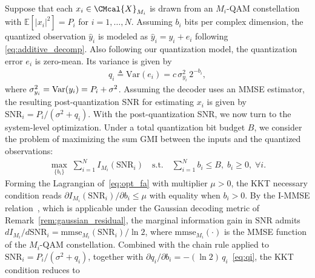 \documentclass[10pt, twocolumn, comsoc]{IEEEtran}
\begin{document}
Suppose that each $x_i \in \CMcal{X}_{M_i}$ is drawn from an $M_i$-QAM constellation with $\mathbb{E}[|x_i|^2] = P_i$ for $i = 1, \ldots, N$.
Assuming $b_i$ bits per complex dimension, the quantized observation $\hat{y}_i$ is modeled as $\hat{y}_i = y_i + e_i$ following \eqref{eq:additive_decomp}. 
Also following our quantization model, the quantization error $e_i$ is zero-mean. Its variance is given by
\begin{align} \label{eq:qi}
  q_i \triangleq \mathrm{Var}(e_i) 
  = c \, \sigma_{y_i}^2 \, 2^{-b_i},
\end{align}
where $\sigma_{y_i}^2 = {\rm{Var}}(y_i) = P_i + \sigma^2$. 
Assuming the decoder uses an MMSE estimator, the resulting post-quantization SNR for estimating $x_i$ is given by $\mathrm{SNR}_i = {P_i}/({\sigma^2 + q_i})$. With the post-quantization SNR, we now turn to the system-level optimization. 
Under a total quantization bit budget $B$, we consider the problem of maximizing the sum GMI between the inputs and the quantized observations:
\begin{align} \label{eq:opt_fa}
  \max_{\{b_i\}} \; \sum_{i=1}^N I_{M_i}(\mathrm{SNR}_i) 
  \quad 
  \text{s.t.} \quad \sum_{i=1}^N b_i \leq B, \; b_i \ge 0, \; \forall i.
\end{align} 
Forming the Lagrangian of~\eqref{eq:opt_fa} with multiplier $\mu > 0$, the KKT necessary condition reads $\partial I_{M_i}(\mathrm{SNR}_i)/\partial b_i \le \mu$ with equality when $b_i > 0$.
By the I-MMSE relation~\cite{GuoShamaiVerdu}, which is applicable under the Gaussian decoding metric of Remark~\ref{rem:gaussian_residual}, the marginal information gain in $\mathrm{SNR}$ admits $dI_{M_i}/d\mathrm{SNR}_i = \mathrm{mmse}_{M_i}(\mathrm{SNR}_i)/\ln 2$, where $\mathrm{mmse}_{M_i}(\cdot)$ is the MMSE function of the $M_i$-QAM constellation. Combined with the chain rule applied to $\mathrm{SNR}_i = P_i/(\sigma^2 + q_i)$, together with $\partial q_i / \partial b_i = -(\ln 2)\, q_i$~\eqref{eq:qi}, the KKT condition reduces to
\end{document}
